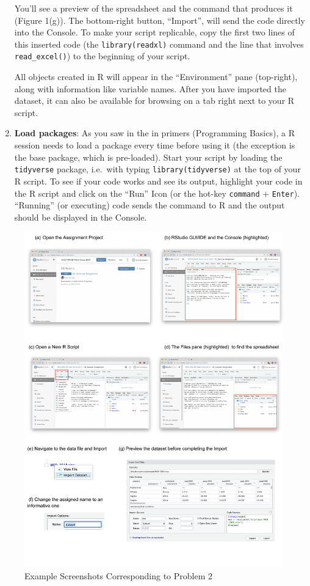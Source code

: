 \documentclass[11pt]{article}
\newcommand{\code}[1]{\colorbox{light-gray}{\texttt{#1}}}
\begin{document}
\begin{enumerate}
  You'll see a preview of the spreadsheet and the command that produces
  it (Figure 1(g)). The bottom-right button, ``Import'', will send the
  code directly into the Console. To make your script replicable, copy
  the first two lines of this inserted code (the \code{library(readxl)}
  command and the line that involves \code{read\_excel()}) to the
  beginning of your script.

  All objects created in R will appear in the ``Environment'' pane
  (top-right), along with information like variable names. After you
  have imported the dataset, it can also be available for browsing on a
  tab right next to your R script.
\item
  \textbf{Load packages}: As you saw in the in primers (Programming
  Basics), a R session needs to load a package every time before using
  it (the exception is the base package, which is pre-loaded). Start
  your script by loading the \texttt{tidyverse} package, i.e.~with
  typing \code{library(tidyverse)} at the top of your R script. To see
  if your code works and see its output, highlight your code in the R
  script and click on the ``Run'' Icon (or the hot-key \texttt{command}
  + \texttt{Enter}). ``Running'' (or executing) code sends the command
  to R and the output should be displayed in the Console.
\end{enumerate}

\begin{figure}[p]
\centering
\includegraphics[width = \textwidth]{images/2019-06-17_assignment_images}
\caption{Example Screenshots Corresponding to Problem 2}
\end{figure}
\end{document}
